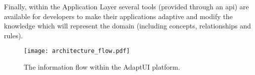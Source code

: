 Finally, within the Application Layer several tools (provided through an \ac{api})
are available for developers to make their applications adaptive and modify the
knowledge which will represent the domain (including concepts, relationships and
rules).

\begin{figure}[H]
\centering
\texttt{[image: architecture\_flow.pdf]}
\caption{The information flow within the AdaptUI platform.}
\label{fig:architecture_flow}
\end{figure}